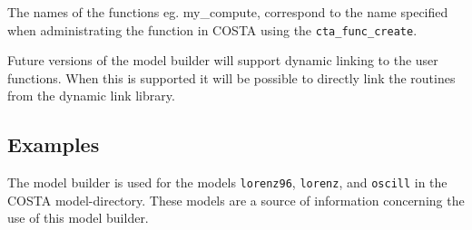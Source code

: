 The names of the functions eg. my\_compute, correspond to the name specified when administrating the function in
COSTA using the {\tt cta\_func\_create}. 

Future versions of the model builder will support dynamic linking to the user functions. When this is supported it
will be possible to directly link the routines from the dynamic link library. 

\subsection{Examples}
The model builder is used for the models \verb|lorenz96|, \verb|lorenz|, and \verb|oscill| in the COSTA model-directory. These models are
a source of information concerning the use of this model builder.


